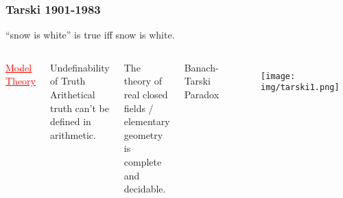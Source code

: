 \documentclass[UTF8,11pt,colorlinks,compress,openany]{beamer}%
\begin{document}
\begin{frame}\frametitle{Tarski 1901-1983}\vspace*{-2ex}
\centerline{``snow is white'' is true iff snow is white.}
\begin{center}
\end{center}\vspace*{-3ex}
\begin{columns}
\begin{center}
\textcolor{red}{\underline{Model Theory}}
\end{center}
\begin{block}{Undefinability of Truth}
Arithetical truth can't be defined in arithmetic.
\end{block}
\begin{block}{}
	The theory of real closed fields / elementary geometry is complete and decidable.
\end{block}
\begin{block}{}
	Banach-Tarski Paradox
\end{block}
\begin{figure}
\texttt{[image: img/tarski1.png]}
\end{figure}
\end{columns}
\end{frame}
\end{document}
